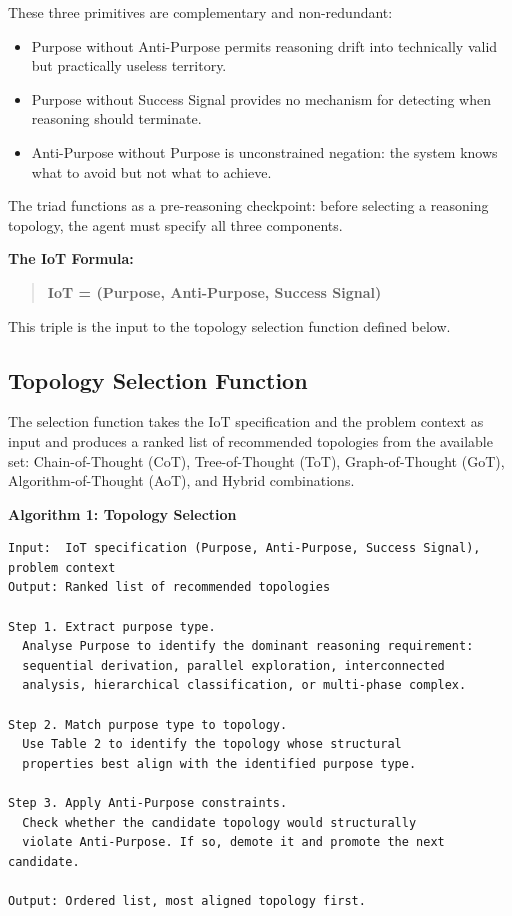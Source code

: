 \documentclass[11pt,a4paper]{article}
\providecommand{\tightlist}{%
  \setlength{\itemsep}{0pt}\setlength{\parskip}{0pt}}
\begin{document}
These three primitives are complementary and non-redundant:

\begin{itemize}
\tightlist
\item
  Purpose without Anti-Purpose permits reasoning drift into technically
  valid but practically useless territory.
\item
  Purpose without Success Signal provides no mechanism for detecting
  when reasoning should terminate.
\item
  Anti-Purpose without Purpose is unconstrained negation: the system
  knows what to avoid but not what to achieve.
\end{itemize}

The triad functions as a pre-reasoning checkpoint: before selecting a
reasoning topology, the agent must specify all three components.

\textbf{The IoT Formula:}

\begin{quote}
\textbf{IoT = (Purpose, Anti-Purpose, Success Signal)}
\end{quote}

This triple is the input to the topology selection function defined
below.

\subsection{Topology Selection
Function}\label{topology-selection-function}

The selection function takes the IoT specification and the problem
context as input and produces a ranked list of recommended topologies
from the available set: Chain-of-Thought (CoT), Tree-of-Thought (ToT),
Graph-of-Thought (GoT), Algorithm-of-Thought (AoT), and Hybrid
combinations.

\textbf{Algorithm 1: Topology Selection}

\begin{verbatim}
Input:  IoT specification (Purpose, Anti-Purpose, Success Signal), problem context
Output: Ranked list of recommended topologies

Step 1. Extract purpose type.
  Analyse Purpose to identify the dominant reasoning requirement:
  sequential derivation, parallel exploration, interconnected
  analysis, hierarchical classification, or multi-phase complex.

Step 2. Match purpose type to topology.
  Use Table 2 to identify the topology whose structural
  properties best align with the identified purpose type.

Step 3. Apply Anti-Purpose constraints.
  Check whether the candidate topology would structurally
  violate Anti-Purpose. If so, demote it and promote the next candidate.

Output: Ordered list, most aligned topology first.
\end{verbatim}
\end{document}
